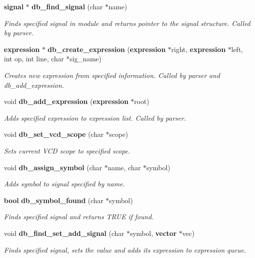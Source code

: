 \begin{CompactItemize}
{\bf signal} $\ast$ {\bf db\_\-find\_\-signal} (char $\ast$name)
\begin{CompactList}\small\item\em Finds specified signal in module and returns pointer to the signal structure. Called by parser.\item\end{CompactList}\item 
{\bf expression} $\ast$ {\bf db\_\-create\_\-expression} ({\bf expression} $\ast$right, {\bf expression} $\ast$left, int op, int line, char $\ast$sig\_\-name)
\begin{CompactList}\small\item\em Creates new expression from specified information. Called by parser and db\_\-add\_\-expression.\item\end{CompactList}\item 
void {\bf db\_\-add\_\-expression} ({\bf expression} $\ast$root)
\begin{CompactList}\small\item\em Adds specified expression to expression list. Called by parser.\item\end{CompactList}\item 
void {\bf db\_\-set\_\-vcd\_\-scope} (char $\ast$scope)
\begin{CompactList}\small\item\em Sets current VCD scope to specified scope.\item\end{CompactList}\item 
void {\bf db\_\-assign\_\-symbol} (char $\ast$name, char $\ast$symbol)
\begin{CompactList}\small\item\em Adds symbol to signal specified by name.\item\end{CompactList}\item 
{\bf bool} {\bf db\_\-symbol\_\-found} (char $\ast$symbol)
\begin{CompactList}\small\item\em Finds specified signal and returns TRUE if found.\item\end{CompactList}\item 
void {\bf db\_\-find\_\-set\_\-add\_\-signal} (char $\ast$symbol, {\bf vector} $\ast$vec)
\begin{CompactList}\small\item\em Finds specified signal, sets the value and adds its expression to expression queue.\item\end{CompactList}\item 

\end{CompactItemize}
